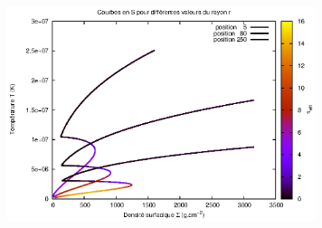 
\begin{frame}

   \begin{figure}[htb!]
      \includegraphics[width=9cm]{figures/S_curves_tau.eps}
   \end{figure}
\end{frame}
